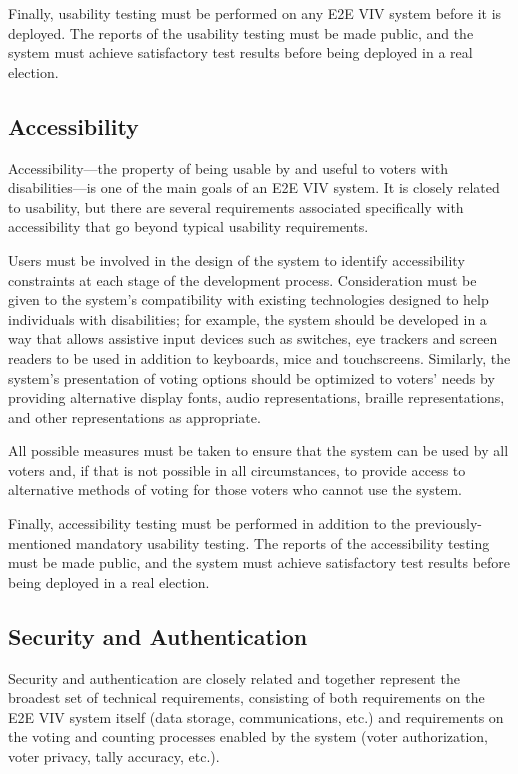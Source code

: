Finally, usability testing must be performed on any E2E VIV system
before it is deployed. The reports of the usability testing must be
made public, and the system must achieve satisfactory test results
before being deployed in a real election.

\subsection{Accessibility}

Accessibility---the property of being usable by and useful to voters
with disabilities---is one of the main goals of an E2E VIV system. It
is closely related to usability, but there are several requirements
associated specifically with accessibility that go beyond typical
usability requirements.

Users must be involved in the design of the system to identify
accessibility constraints at each stage of the development
process. Consideration must be given to the system's compatibility
with existing technologies designed to help individuals with
disabilities; for example, the system should be developed in a way
that allows assistive input devices such as switches, eye trackers and
screen readers to be used in addition to keyboards, mice and
touchscreens. Similarly, the system's presentation of voting options
should be optimized to voters' needs by providing alternative display
fonts, audio representations, braille representations, and other
representations as appropriate.

All possible measures must be taken to ensure that the system can be
used by all voters and, if that is not possible in all circumstances,
to provide access to alternative methods of voting for those voters
who cannot use the system.

Finally, accessibility testing must be performed in addition to the
previously-mentioned mandatory usability testing. The reports of the
accessibility testing must be made public, and the system must achieve
satisfactory test results before being deployed in a real election.

\subsection{Security and Authentication}

Security and authentication are closely related and together represent
the broadest set of technical requirements, consisting of both
requirements on the E2E VIV system itself (data storage,
communications, etc.) and requirements on the voting and counting
processes enabled by the system (voter authorization, voter privacy,
tally accuracy, etc.).

